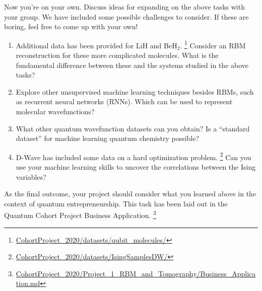 \documentclass[12pt]{article}
\begin{document}
Now you're on your own.  Discuss ideas for expanding on the above tasks with your group.  We have included some possible challenges to consider.  If these are boring, feel free to come up with your own!
\begin{enumerate}
\item Additional data has been provided for LiH and BeH$_2$. 
\footnote{ \href{https://github.com/CDL-Quantum/CohortProject_2020/tree/master/datasets/qubit_molecules}{CohortProject\_2020/datasets/qubit\_molecules/} }
Consider an RBM reconstruction for these more complicated molecules.  What is the fundamental difference between these and the systems studied in the above tasks?
\item Explore other unsupervised machine learning techniques besides RBMs, such as recurrent neural networks (RNNs).  Which can be used to represent molecular wavefunctions?
\item What other quantum wavefunction datasets can you obtain?  Is a ``standard dataset'' for machine learning quantum chemistry possible?
\item D-Wave has included some data on a hard optimization problem.
\footnote{ \href{https://github.com/CDL-Quantum/CohortProject_2020/tree/master/datasets/IsingSamplesDW}{CohortProject\_2020/datasets/IsingSamplesDW/} }
Can you use your machine learning skills to uncover the correlations between the Ising variables?

\end{enumerate}

As the final outcome, your project should consider what you learned above in the context of quantum entrepreneurship.  
This task has been laid out in the Quantum Cohort Project Business Application.
\footnote{\href{https://github.com/CDL-Quantum/CohortProject_2020/blob/master/Project_1_RBM_and_Tomography/Business_Application.md}{CohortProject\_2020/Project\_1\_RBM\_and\_Tomography/Business\_Application.md}}






\end{document}
